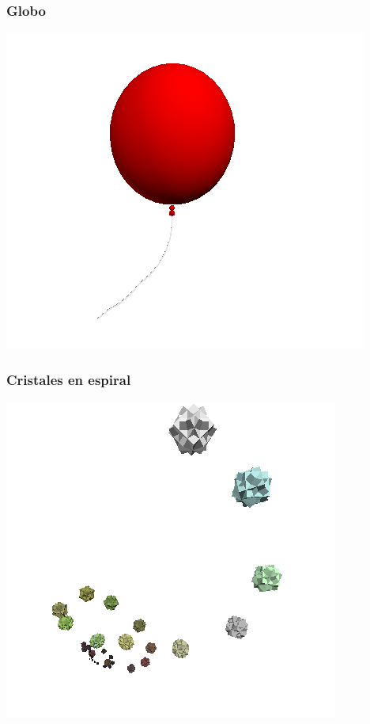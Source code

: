 \subsubsection{Globo}



\centerline{\includegraphics[scale=0.40]{../imagenes/eg23.png}}


\subsubsection{Cristales en espiral}



\centerline{\includegraphics[scale=0.40]{../imagenes/eg24.png}}


